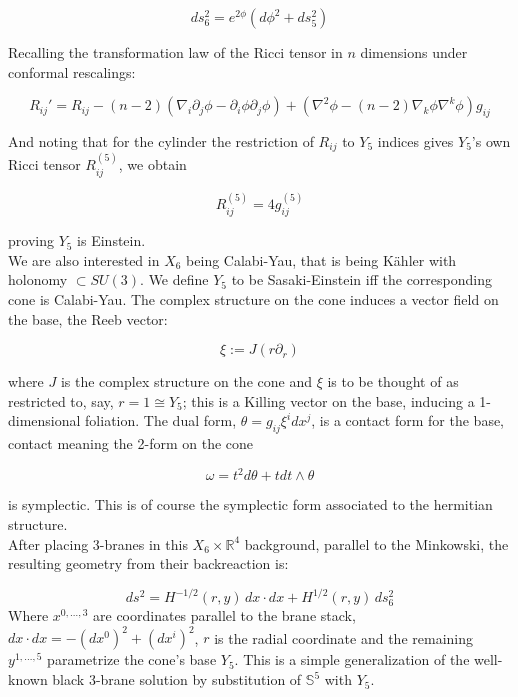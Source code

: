 \begin{equation}
	ds_6^2 = e^{2\phi} \left( d\phi^2 + ds_5^2 \right)
\end{equation}

Recalling the transformation law of the Ricci tensor in $n$ dimensions under conformal rescalings:

\begin{equation}
	R_{ij}' = R_{ij} - (n-2)\left( \nabla_i \partial_j \phi - \partial_i \phi \partial_j \phi \right) + \left( \nabla^2 \phi - (n-2) \nabla_k \phi \nabla^k \phi \right) g_{ij}
\end{equation}

And noting that for the cylinder the restriction of $R_{ij}$ to $Y_5$ indices gives $Y_5$'s own Ricci tensor $R_{ij}^{(5)}$, we obtain

\begin{equation}
	R^{(5)}_{ij} = 4 g_{ij}^{(5)}
\end{equation}

proving $Y_5$ is Einstein.\\

We are also interested in $X_6$ being Calabi-Yau, that is being K\"ahler with holonomy $\subset SU(3)$. We define $Y_5$ to be Sasaki-Einstein iff the corresponding cone is Calabi-Yau. The complex structure on the cone induces a vector field on the base, the Reeb vector:%

\begin{equation}
	\xi := J (r \partial_r)
\end{equation}

where $J$ is the complex structure on the cone and $\xi$ is to be thought of as restricted to, say, ${r=1} \cong Y_5$; this is a Killing vector on the base, inducing a 1-dimensional foliation. The dual form, $\theta = g_{ij} \xi^i dx^j$, is a contact form for the base, contact meaning the 2-form on the cone

\begin{equation}
	\omega = t^2 d\theta + t dt \wedge \theta
\end{equation}

is symplectic. This is of course the symplectic form associated to the hermitian structure.\\

After placing 3-branes in this $X_6 \times \mathbb{R}^4$ background, parallel to the Minkowski, the resulting geometry from their backreaction is:

\begin{equation}
ds^2 = H^{-1/2}(r,y) \, dx\cdot dx + H^{1/2}(r,y) \, ds_6^2
\end{equation}
Where $x^{0,\ldots,3}$ are coordinates parallel to the brane stack, $dx\cdot dx = -(dx^0)^2 + (dx^i)^2$, $r$ is the radial coordinate and the remaining $y^{1,\ldots,5}$ parametrize the cone's base $Y_5$. This is a simple generalization of the well-known black 3-brane solution by substitution of $\mathbb{S}^5$ with $Y_5$.\\

